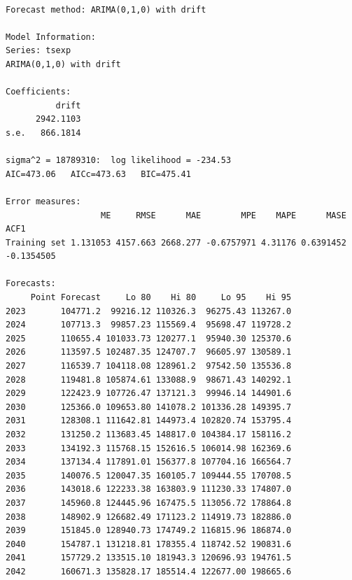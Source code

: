 \documentclass[
  letterpaper,
  DIV=11,
  numbers=noendperiod]{scrreport}
\begin{document}
\begin{verbatim}

Forecast method: ARIMA(0,1,0) with drift

Model Information:
Series: tsexp 
ARIMA(0,1,0) with drift 

Coefficients:
          drift
      2942.1103
s.e.   866.1814

sigma^2 = 18789310:  log likelihood = -234.53
AIC=473.06   AICc=473.63   BIC=475.41

Error measures:
                   ME     RMSE      MAE        MPE    MAPE      MASE       ACF1
Training set 1.131053 4157.663 2668.277 -0.6757971 4.31176 0.6391452 -0.1354505

Forecasts:
     Point Forecast     Lo 80    Hi 80     Lo 95    Hi 95
2023       104771.2  99216.12 110326.3  96275.43 113267.0
2024       107713.3  99857.23 115569.4  95698.47 119728.2
2025       110655.4 101033.73 120277.1  95940.30 125370.6
2026       113597.5 102487.35 124707.7  96605.97 130589.1
2027       116539.7 104118.08 128961.2  97542.50 135536.8
2028       119481.8 105874.61 133088.9  98671.43 140292.1
2029       122423.9 107726.47 137121.3  99946.14 144901.6
2030       125366.0 109653.80 141078.2 101336.28 149395.7
2031       128308.1 111642.81 144973.4 102820.74 153795.4
2032       131250.2 113683.45 148817.0 104384.17 158116.2
2033       134192.3 115768.15 152616.5 106014.98 162369.6
2034       137134.4 117891.01 156377.8 107704.16 166564.7
2035       140076.5 120047.35 160105.7 109444.55 170708.5
2036       143018.6 122233.38 163803.9 111230.33 174807.0
2037       145960.8 124445.96 167475.5 113056.72 178864.8
2038       148902.9 126682.49 171123.2 114919.73 182886.0
2039       151845.0 128940.73 174749.2 116815.96 186874.0
2040       154787.1 131218.81 178355.4 118742.52 190831.6
2041       157729.2 133515.10 181943.3 120696.93 194761.5
2042       160671.3 135828.17 185514.4 122677.00 198665.6
\end{verbatim}
\end{document}
